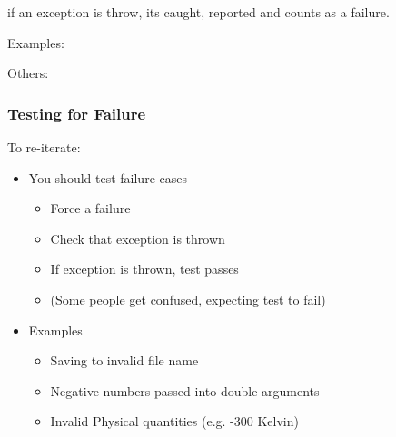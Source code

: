 if an exception is throw, its caught, reported and counts as a failure.

Examples:

\begin{Shaded}
\begin{Highlighting}[]
     \NormalTok{);}
     \NormalTok{);}
\end{Highlighting}
\end{Shaded}

Others:

\begin{Shaded}
\begin{Highlighting}[]
     
       
\end{Highlighting}
\end{Shaded}

\subsubsection{Testing for Failure}\label{testing-for-failure}

To re-iterate:

\begin{itemize}
\itemsep1pt\parskip0pt
\item
  You should test failure cases

  \begin{itemize}
  \itemsep1pt\parskip0pt
  \item
    Force a failure
  \item
    Check that exception is thrown
  \item
    If exception is thrown, test passes
  \item
    (Some people get confused, expecting test to fail)
  \end{itemize}
\item
  Examples

  \begin{itemize}
  \itemsep1pt\parskip0pt
  \item
    Saving to invalid file name
  \item
    Negative numbers passed into double arguments
  \item
    Invalid Physical quantities (e.g. -300 Kelvin)
  \end{itemize}
\end{itemize}

